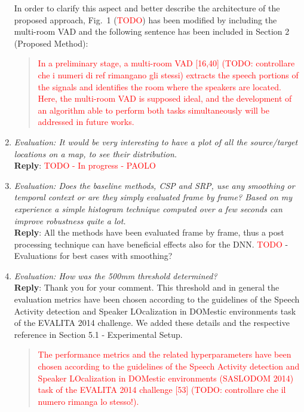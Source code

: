 \documentclass[11pt, technote, letterpaper, oneside, onecolumn]{IEEEtran}
\begin{document}
\begin{enumerate}
In order to clarify this aspect and better describe the architecture of the proposed approach, Fig.~1 (\textcolor{red}{TODO}) has been modified by including the multi-room VAD and the following sentence has been included in Section 2 (Proposed Method):
\begin{quote}
\textcolor{red}{
In a preliminary stage, a multi-room VAD [16,40] (\textcolor{red}{TODO: controllare che i numeri di ref rimangano gli stessi}) extracts the speech portions of the signals and identifies the room where the speakers are located. Here, the multi-room VAD is supposed ideal, and the development of an algorithm able to perform both tasks simultaneously will be addressed in future works.}
\end{quote}
 
\item \textit{Evaluation: It would be very interesting to have a plot of all the source/target locations on a map, to see their distribution.\\}
\textbf{Reply}: \textcolor{red}{TODO - In progress - PAOLO}

\item \textit{Evaluation: Does the baseline methods, CSP and SRP, use any smoothing or temporal context or are they simply evaluated frame by frame? Based on my experience a simple histogram technique computed over a few seconds can improve robustness quite a lot.\\}
\textbf{Reply}: All the methods have been evaluated frame by frame, thus a post processing technique can have beneficial effects also for the DNN. \textcolor{red}{TODO} - Evaluations for best cases with smoothing?

\item \textit{Evaluation: How was the 500mm threshold determined?\\}
\textbf{Reply}: Thank you for your comment. This threshold and in general the evaluation metrics have been chosen according to the guidelines of the Speech Activity detection and Speaker LOcalization in DOMestic environments task of the EVALITA 2014 challenge. We added these details and the respective reference in Section 5.1 - Experimental Setup.
\begin{quote}
	\textcolor{red}{The performance metrics and the related hyperparameters have been chosen according to the guidelines of the Speech Activity detection and Speaker LOcalization in DOMestic environments (SASLODOM 2014) task of the EVALITA 2014 challenge [53] (TODO: controllare che il numero rimanga lo stesso!).}
\end{quote}


\end{enumerate}
\end{document}
